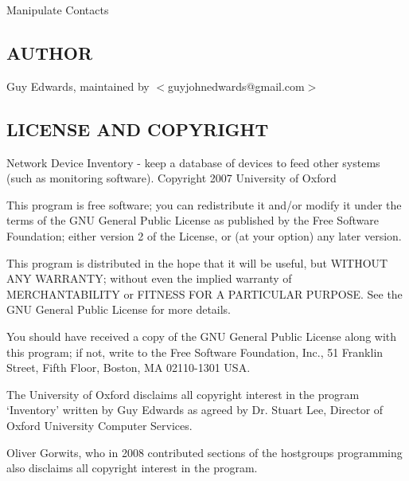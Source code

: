\documentclass{book}
\begin{document}
Manipulate Contacts


\subsection{AUTHOR}
\label{Inventory::Contacts_AUTHOR}
\hypertarget{Inventory::Contacts_AUTHOR}{}



Guy Edwards, maintained by $<$guyjohnedwards@gmail.com$>$


\subsection{LICENSE AND COPYRIGHT}
\label{Inventory::Contacts_LICENSE_AND_COPYRIGHT}
\hypertarget{Inventory::Contacts_LICENSE_AND_COPYRIGHT}{}



Network Device Inventory - keep a database of devices to feed other systems (such as monitoring software). Copyright 2007 University of Oxford



This program is free software; you can redistribute it and/or modify it under the terms of the GNU General Public License as published by the Free Software Foundation; either version 2 of the License, or (at your option) any later version.



This program is distributed in the hope that it will be useful, but WITHOUT ANY WARRANTY; without even the implied warranty of MERCHANTABILITY or FITNESS FOR A PARTICULAR PURPOSE. See the GNU General Public License for more details.



You should have received a copy of the GNU General Public License along with this program; if not, write to the Free Software Foundation, Inc., 51 Franklin Street, Fifth Floor, Boston, MA 02110-1301 USA.



The University of Oxford disclaims all copyright interest in the program `Inventory' written by Guy Edwards as agreed by Dr. Stuart Lee, Director of Oxford University Computer Services.



Oliver Gorwits, who in 2008 contributed sections of the hostgroups programming also disclaims all copyright interest in the program.


\end{document}
